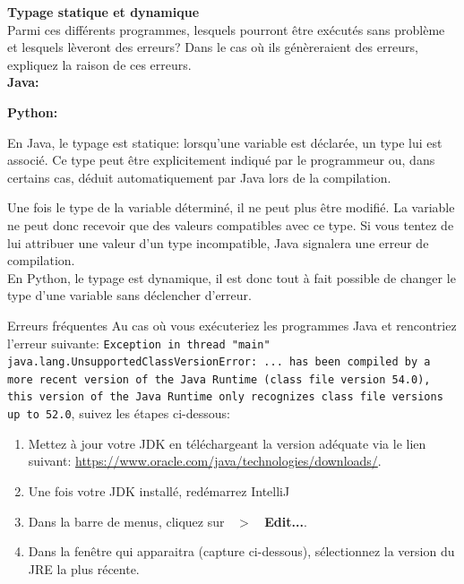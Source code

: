 \begin{Exercice}[10 minutes]  \textbf{Typage statique et dynamique}\\
    
    Parmi ces différents programmes, lesquels pourront être exécutés sans problème et lesquels lèveront des erreurs? Dans le cas où ils génèreraient des erreurs, expliquez la raison de ces erreurs.\\
    
    \textbf{Java:}
    
    
    
    \textbf{Python:}
    
    
    

    \begin{conseil}
    
        En Java, le typage est statique: lorsqu'une variable est déclarée, un type lui est associé. Ce type peut être explicitement indiqué par le programmeur ou, dans certains cas, déduit automatiquement par Java lors de la compilation. \newline
        
        Une fois le type de la variable déterminé, il ne peut plus être modifié. La variable ne peut donc recevoir que des valeurs compatibles avec ce type. Si vous tentez de lui attribuer une valeur d'un type incompatible, Java signalera une erreur de compilation. \\

        En Python, le typage est dynamique, il est donc tout à fait possible de changer le type d'une variable sans déclencher d'erreur. \\

    \end{conseil}

    \begin{Example}{\faTriangleExclamation \quad Erreurs fréquentes}
        Au cas où vous exécuteriez les programmes Java et rencontriez l'erreur suivante: \lstinline{Exception in thread "main" java.lang.UnsupportedClassVersionError: ... has been compiled by a more recent version of the Java Runtime (class file version 54.0), this version of the Java Runtime only recognizes class file versions up to 52.0}, suivez les étapes ci-dessous:
        \begin{enumerate}
            \item Mettez à jour votre JDK en téléchargeant la version adéquate via le lien suivant: \url{https://www.oracle.com/java/technologies/downloads/}.
            \item Une fois votre JDK installé, redémarrez IntelliJ
            \item Dans la barre de menus, cliquez sur \textbf{\faEllipsisVertical \ $>$ \ Edit...}.
            \item Dans la fenêtre qui apparaitra (capture ci-dessous), sélectionnez la version du JRE la plus récente.
        \end{enumerate}
        

\end{Example}
\end{Exercice}
